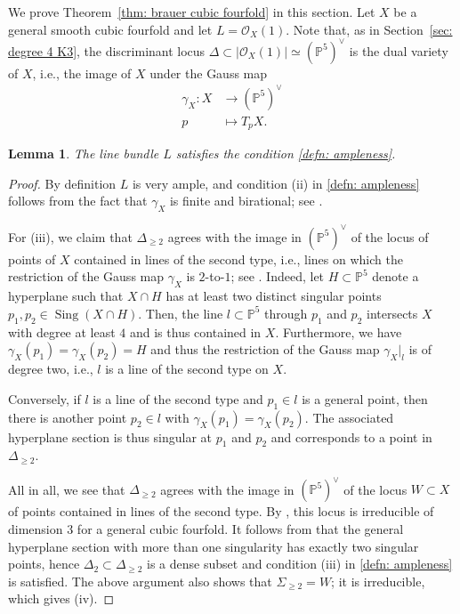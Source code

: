 \documentclass[11pt]{amsart}
\theoremstyle{plain}
\newtheorem{lem}[thm]{Lemma}
\theoremstyle{definition}
\theoremstyle{remark}
\DeclareMathOperator{\Sing}{Sing}
\begin{document}
We prove Theorem~\ref{thm: brauer cubic fourfold} in this section. Let $X$ be a general smooth cubic fourfold and let $L = \mathcal{O}_X(1)$. Note that, as in Section~\ref{sec: degree 4 K3}, the discriminant locus $\Delta \subset |\mathcal O_X(1)| \simeq (\mathbb P^5)^\vee$ is the dual variety of $X$, i.e., the image of $X$ under the Gauss map
\begin{align*}
    \gamma_X \colon X &\to (\mathbb P^5)^\vee \\
    p &\mapsto T_p X.
\end{align*}
\begin{lem}\label{lem: dagger cubic}
    The line bundle $L$ satisfies the condition \ref{defn: ampleness}.
\end{lem}
\begin{proof}
By definition $L$ is very ample, and condition (ii) in \ref{defn: ampleness} follows from the fact that $\gamma_X$ is finite and birational; see \cite[Corollary~10.26]{3264andallthat}.

For (iii), we claim that $\Delta_{\geq 2}$ agrees with the image in $(\mathbb P^5)^\vee$ of the locus of points of $X$ contained in lines of the second type, i.e., lines on which the restriction of the Gauss map $\gamma_X$ is $2$-to-$1$; see \cite[Section~2.2]{geometryofcubics}. Indeed, let $H \subset \mathbb P^5$ denote a hyperplane such that $X \cap H$
 has at least two distinct singular points $p_1, p_2 \in \Sing(X \cap H)$. Then, the line $l \subset \mathbb P^5$ through $p_1$ and $p_2$ intersects $X$ with degree at least $4$ and is thus contained in $X$. Furthermore, we have $\gamma_X(p_1) = \gamma_X(p_2) = H$ and thus the restriction of the Gauss map $\gamma_X|_l$ is of degree two, i.e., $l$ is a line of the second type on $X$.
 
 Conversely, if $l$ is a line of the second type and $p_1 \in l$ is a general point, then there is another point $p_2 \in l$ with $\gamma_X(p_1) = \gamma_X(p_2).$ The associated hyperplane section is thus singular at $p_1$ and $p_2$ and corresponds to a point in $\Delta_{\geq 2}$.
 
 All in all, we see that $\Delta_{\geq 2}$ agrees with the image in $(\mathbb P^5)^\vee$ of the locus $W\subset X$ of points contained in lines of the second type. By \cite[Corollary~2.2.14]{geometryofcubics}, this locus is irreducible of dimension $3$ for a general cubic fourfold. It follows from \cite[Corollary~3.7]{gounelaskouvidakis} that the general hyperplane section with more than one singularity has exactly two singular points, hence $\Delta_2 \subset \Delta_{\geq 2}$ is a dense subset and condition (iii) in \ref{defn: ampleness} is satisfied. The above argument also shows that $\Sigma_{\geq 2} = W$; it is irreducible, which gives (iv).
\end{proof}
\end{document}
